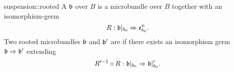 \begin{mydefinition}{suspension::rooted}
    A  $\mathfrak{b}$ over $B$ is a microbundle over $B$ together with an isomorphism-germ
    \[ R: \mathfrak{b}\vert_{b_0} \Rightarrow{} \mathfrak{e}^{n}_{b_0}. \]
    Two rooted microbundles $\mathfrak{b}$ and $\mathfrak{b}'$ are  if there exists an isomorphism germ $\mathfrak{b} \Rightarrow{} \mathfrak{b}'$ extending
    \[ R'^{-1} \circ R: \mathfrak{b}\vert_{b_0} \Rightarrow{}{} \mathfrak{b}\vert_{b_0}'. \]
\end{mydefinition}